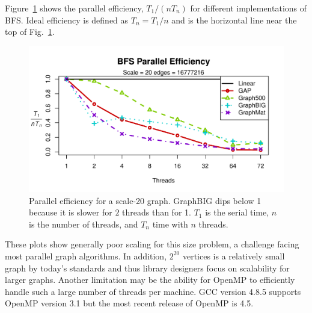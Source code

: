 \documentclass[conference]{IEEEtran}
\begin{document}
Figure~\ref{fig:bfs-efficiency} shows the parallel efficiency,  $T_1 / (nT_n)$ for different implementations of BFS. Ideal efficiency is defined as $T_n = T_1/n$ and is the horizontal line near the top of Fig.~\ref{fig:bfs-efficiency}. 
\begin{figure}[htb]
	\centering
		\includegraphics[width=\linewidth, trim=0 18pt 18pt 12pt, clip]{graphics/bfs_ss20.pdf}
	\caption{Parallel efficiency for a scale-20 graph. GraphBIG dips below 1 because it is slower for $2$ threads than for 1. $T_1$ is the serial time, $n$ is the number of threads, and $T_n$ time with $n$ threads.}
	\label{fig:bfs-efficiency}
\end{figure}

These plots show generally poor scaling for this size problem, a challenge facing most parallel graph algorithms. 
In addition, $2^{20}$ vertices is a relatively small graph by today's standards and thus library designers focus on scalability for larger graphs. Another limitation may be the ability for OpenMP to efficiently handle such a large number of threads per machine. GCC version 4.8.5 supports OpenMP version 3.1 but the most recent release of OpenMP is 4.5.
\end{document}
